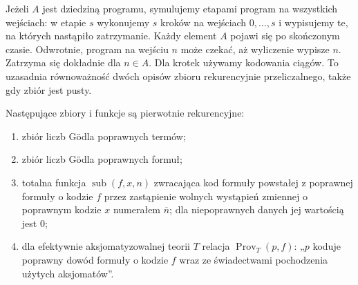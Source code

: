 \begin{uwaga}\label{res:6:4}
Jeżeli $A$ jest dziedziną programu, symulujemy etapami program na wszystkich wejściach: w etapie $s$ wykonujemy $s$ kroków na wejściach $0,\ldots,s$ i wypisujemy te, na których nastąpiło zatrzymanie. Każdy element $A$ pojawi się po skończonym czasie. Odwrotnie, program na wejściu $n$ może czekać, aż wyliczenie wypisze $n$. Zatrzyma się dokładnie dla $n\in A$. Dla krotek używamy kodowania ciągów. To uzasadnia równoważność dwóch opisów zbioru rekurencyjnie przeliczalnego, także gdy zbiór jest pusty.
\end{uwaga}

\begin{lemat}\label{res:6:5}
Następujące zbiory i funkcje są pierwotnie rekurencyjne:
\begin{enumerate}[label=(\alph*)]
\item zbiór liczb Gödla poprawnych termów;
\item zbiór liczb Gödla poprawnych formuł;
\item totalna funkcja $\operatorname{sub}(f,x,n)$ zwracająca kod formuły powstałej z poprawnej formuły o kodzie $f$ przez zastąpienie wolnych wystąpień zmiennej o poprawnym kodzie $x$ numerałem $\overline n$; dla niepoprawnych danych jej wartością jest $0$;
\item dla efektywnie aksjomatyzowalnej teorii $T$ relacja $\operatorname{Prov}_T(p,f)$: „$p$ koduje poprawny dowód formuły o kodzie $f$ wraz ze świadectwami pochodzenia użytych aksjomatów”.
\end{enumerate}
\end{lemat}

